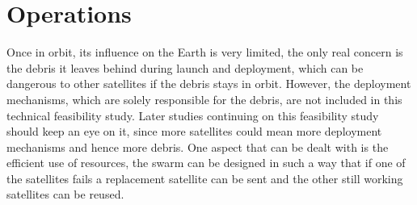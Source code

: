 \section{Operations}
\label{blSSOPE}

Once in orbit, its influence on the Earth is very limited, the only real concern is the debris it leaves behind during launch and deployment, which can be dangerous to other satellites if the debris stays in orbit.
However, the deployment mechanisms, which are solely responsible for the debris, are not included in this technical feasibility study. Later studies continuing on this feasibility study should keep an eye on it, since more satellites could mean more deployment mechanisms and hence more debris.
One aspect that can be dealt with is the efficient use of resources, the swarm can be designed in such a way that if one of the satellites fails a replacement satellite can be sent and the other still working satellites can be reused.